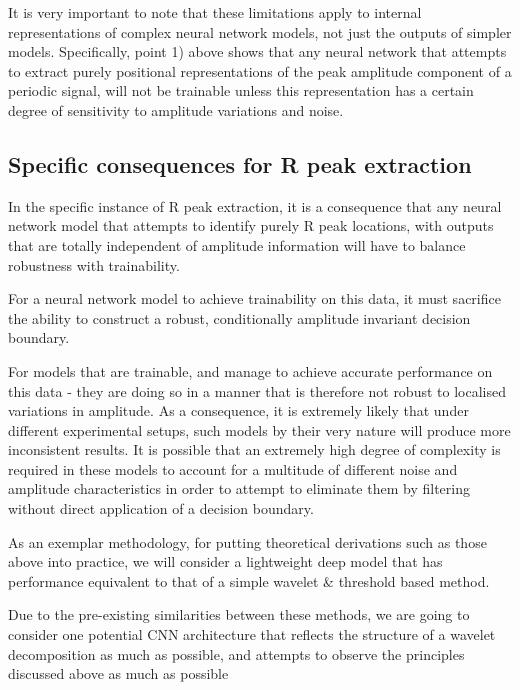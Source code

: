 \documentclass[9pt,conference]{IEEEtran}
\begin{document}
It is very important to note that these limitations apply to internal representations of complex neural network models, not just the outputs of simpler models. Specifically, point 1) above shows that any neural network that attempts to extract purely positional representations of the peak amplitude component of a periodic signal, will not be trainable unless this representation has a certain degree of sensitivity to amplitude variations and noise.

\subsection{Specific consequences for R peak extraction}
In the specific instance of R peak extraction, it is a consequence that any neural network model that attempts to identify purely R peak locations, with outputs that are totally independent of amplitude information will have to balance robustness with trainability.

For a neural network model to achieve trainability on this data, it must sacrifice the ability to construct a robust, conditionally amplitude invariant decision boundary. 

For models that are trainable, and manage to achieve accurate performance on this data - they are doing so in a manner that is therefore not robust to localised variations in amplitude. As a consequence, it is extremely likely that under different experimental setups, such models by their very nature will produce more inconsistent results. It is possible that an extremely high degree of complexity is required in these models to account for a multitude of different noise and amplitude characteristics in order to attempt to eliminate them by filtering without direct application of a decision boundary. 

As an exemplar methodology, for putting theoretical derivations such as those above into practice, we will consider a lightweight deep model that has performance equivalent to that of a simple wavelet \& threshold based method.

Due to the pre-existing similarities between these methods, we are going to consider one potential CNN architecture that reflects the structure of a wavelet decomposition as much as possible, and attempts to observe the principles discussed above as much as possible
\end{document}
